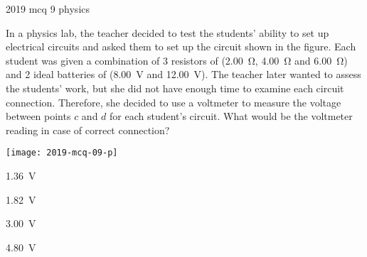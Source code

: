\ylDisplay
{}%
{2019}%
{mcq}%
{9}%
{physics}%
{}%
{
\ifStatement
In a physics lab, the teacher decided to test the students' ability to set up electrical circuits and  asked them to set up the circuit shown in the figure. Each student was given a combination of 3 resistors of (\SI{2.00}{\ohm}, \SI{4.00}{\ohm} and \SI{6.00}{\ohm}) and 2 ideal batteries of (\SI{8.00}{\V} and \SI{12.00}{\V}).  The teacher later wanted to assess the students' work, but she did not have enough time to  examine each circuit connection. Therefore, she decided to use a voltmeter to measure the voltage between points $c$ and $d$ for each student’s circuit. What would be the voltmeter reading in case of correct connection?
\begin{center}
  \texttt{[image: 2019-mcq-09-p]}
\end{center}
\fi


\SI{1.36}{\V}
\fi


\SI{1.82}{\V}
\fi


\SI{3.00}{\V}
\fi


\SI{4.80}{\V}
\fi


\ifHint

\fi


\ifSolution

\fi


\ifEstStatement

\fi



\fi



\fi



\fi



\fi


\ifEstHint

\fi


\ifEstSolution

\fi
}
